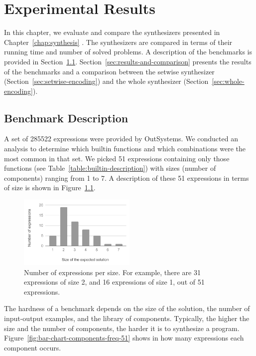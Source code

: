 \chapter{Experimental Results}
\label{chap:experimental-results}

In this chapter, we evaluate and compare the synthesizers presented in
Chapter~\ref{chap:synthesis} .
The synthesizers are compared in terms of their running time and number of
solved problems.
A description of the benchmarks is provided in Section~\ref{sec:bench-desc}.
Section~\ref{sec:results-and-comparison} presents the results of the benchmarks
and a comparison between the setwise synthesizer
(Section~\ref{sec:setwise-encoding}) and the whole synthesizer
(Section~\ref{sec:whole-encoding}).

\section{Benchmark Description}
\label{sec:bench-desc}

A set of 285522 expressions were provided by OutSystems.
We conducted an analysis to determine which builtin functions and which
combinations were the most common in that set.
We picked 51 expressions containing only those functions (see
Table~\ref{table:builtin-description}) with sizes (number of components) ranging
from 1 to 7.
A description of these 51 expressions in terms of size is shown in
Figure~\ref{fig:bar-chart-sizes-51}.

\begin{figure}
  \centering
  \includegraphics[width=0.5\textwidth]{assets/bar-chart-sizes-51.pdf}
  \caption{Number of expressions per size. For example, there are 31
    expressions of size 2, and 16 expressions of size 1, out of 51 expressions.}
  \label{fig:bar-chart-sizes-51}
\end{figure}

The hardness of a benchmark depends on the size of the solution, the number of
input-output examples, and the library of components.
Typically, the higher the size and the number of components, the harder it is to
synthesize a program.
Figure~\ref{fig:bar-chart-components-freq-51} shows in how many expressions each
component occurs.

